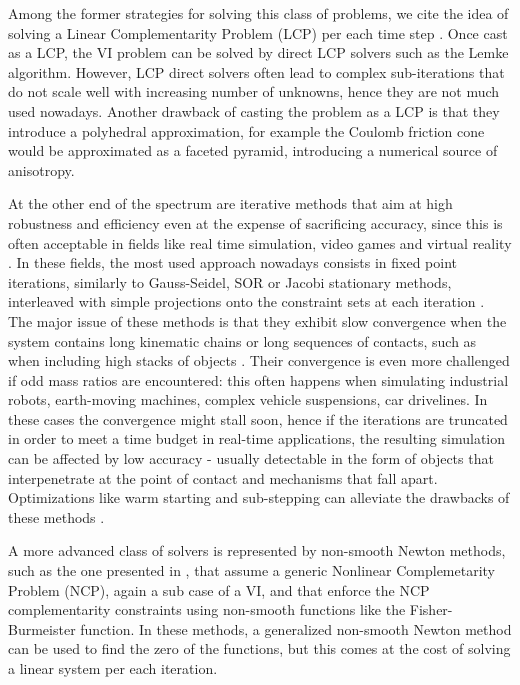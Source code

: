 \documentclass[AMA,STIX1COL]{WileyNJD-v2}
\begin{document}
Among the former strategies for solving this class of problems, we cite the idea of solving a Linear Complementarity Problem (LCP) per each time step
\cite{StTr95}  %
.
Once cast as a LCP, the VI problem can be solved by direct LCP solvers such as the Lemke algorithm. However, LCP direct solvers often lead to complex sub-iterations that do not scale well with increasing number of unknowns, hence they are not much used nowadays. Another drawback of casting the problem as a LCP is that they introduce a polyhedral approximation, for example the Coulomb friction cone would be approximated as a faceted pyramid, introducing a numerical source of anisotropy. 

At the other end of the spectrum are iterative methods that aim at high robustness and efficiency even at the expense of sacrificing accuracy, since this is often acceptable in fields like real time simulation, video games and virtual reality \cite{Bender2014}.
In these fields, the most used approach nowadays consists in fixed point iterations, similarly to Gauss-Seidel, SOR or Jacobi stationary methods, interleaved with simple projections onto the constraint sets at each iteration
\cite{anitescuTasora2008,massSplittingRichard2012,AleMihaiFriction2013} %
.
The major issue of these methods is that they exhibit slow convergence when the system contains long kinematic chains or long sequences of contacts, such as when including high stacks of objects \cite{TasoraAnitescuCMAME10}. Their convergence is even more challenged if odd mass ratios are encountered: this often happens when simulating industrial robots, earth-moving machines, complex vehicle suspensions, car drivelines. In these cases the convergence might stall soon, hence if the iterations are truncated in order to meet a time budget in real-time applications, the resulting simulation can be affected by low accuracy - usually detectable in the form of objects that interpenetrate at the point of contact and mechanisms that fall apart. Optimizations like warm starting and sub-stepping can alleviate the drawbacks of these methods \cite{Macklin2019a}.

A more advanced class of solvers is represented by non-smooth Newton methods, such as the one presented in 
\cite{Macklin2019} %
, that assume a generic Nonlinear Complemetarity Problem (NCP), again a sub case of a VI, and that enforce the NCP complementarity constraints using non-smooth functions like the Fisher-Burmeister function. In these methods, a generalized non-smooth Newton method can be used to find the zero of the functions, but this comes at the cost of solving a linear system per each iteration.
\end{document}
